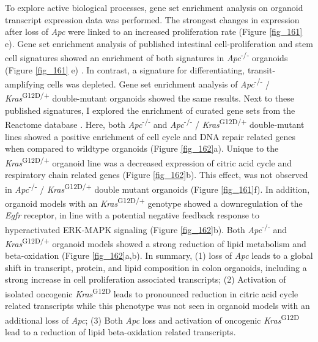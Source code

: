 \begin{flushleft}
To explore active biological processes, gene set enrichment analysis on organoid transcript expression data was performed. The strongest changes in expression after loss of \textit{Apc} were linked to an increased proliferation rate (Figure \ref{fig_161} e). Gene set enrichment analysis of published intestinal cell-proliferation and stem cell signatures showed an enrichment of both signatures in \textit{Apc}\textsuperscript{-/-}  organoids (Figure \ref{fig_161} e) \citep{merlos-suarezIntestinalStemCell2011}. In contrast, a signature for differentiating, transit-amplifying cells was depleted. Gene set enrichment analysis of \textit{Apc}\textsuperscript{-/-} / \textit{Kras}\textsuperscript{G12D/+} double-mutant organoids showed the same results. Next to these published signatures, I explored the enrichment of curated gene sets from the Reactome database \citep{grissReactomeGSAEfficientMultiOmics2020}. Here, both \textit{Apc}\textsuperscript{-/-}  and \textit{Apc}\textsuperscript{-/-} / \textit{Kras}\textsuperscript{G12D/+} double-mutant lines showed a positive enrichment of cell cycle and DNA repair related genes when compared to wildtype organoids (Figure \ref{fig_162}a). Unique to the \textit{Kras}\textsuperscript{G12D/+} organoid line was a decreased expression of citric acid cycle and respiratory chain related genes (Figure \ref{fig_162}b). This effect, was not observed in \textit{Apc}\textsuperscript{-/-} / \textit{Kras}\textsuperscript{G12D/+} double mutant organoids (Figure \ref{fig_161}f). In addition, organoid models with an \textit{Kras}\textsuperscript{G12D/+} genotype showed a downregulation of the \textit{Egfr} receptor, in line with a potential negative feedback response to hyperactivated ERK-MAPK signaling (Figure \ref{fig_162}b). Both \textit{Apc}\textsuperscript{-/-}  and \textit{Kras}\textsuperscript{G12D/+} organoid models showed a strong reduction of lipid metabolism and beta-oxidation (Figure \ref{fig_162}a,b). In summary, (1) loss of \textit{Apc} leads to a global shift in transcript, protein, and lipid composition in colon organoids, including a strong increase in cell proliferation associated transcripts; (2) Activation of isolated oncogenic \textit{Kras}\textsuperscript{G12D} leads to pronounced reduction in citric acid cycle related transcripts while this phenotype was not seen in organoid models with an additional loss of \textit{Apc}; (3) Both \textit{Apc} loss and activation of oncogenic \textit{Kras}\textsuperscript{G12D} lead to a reduction of lipid beta-oxidation related transcripts.


\end{flushleft}
